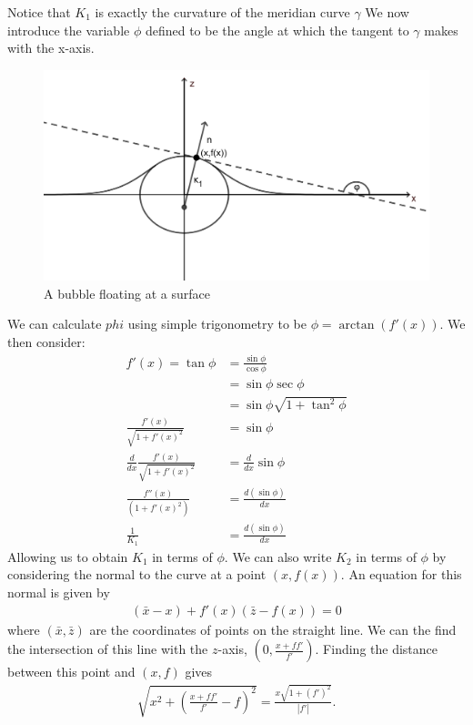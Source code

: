 Notice that $K_1$ is exactly the curvature of the meridian curve $\gamma$
We now introduce the variable $\phi$ defined to be the angle at which the tangent to $\gamma$ makes with the x-axis. 
\begin{figure}[hb]
    \centering
    \includegraphics[width=0.55\linewidth]{WriteUp/images/tangent to bubble extra.png}
    \caption{A bubble floating at a surface}
    \label{fig:1}
\end{figure}
We can calculate $phi$ using simple trigonometry to be $\phi=\arctan(f'(x))$. We then consider:
\begin{align}
    f'(x)=\tan \phi &= \frac{\sin\phi}{\cos\phi} \\
    &=\sin\phi\sec\phi \\
    &=\sin\phi \sqrt{1+\tan^2\phi}\\
    \frac{f'(x)}{\sqrt{1+f'(x)^2}}&=\sin\phi\\
    \frac{d}{dx} \frac{f'(x)}{\sqrt{1+f'(x)^2}}&=\frac{d}{dx}\sin\phi \\
    \frac{f''(x)}{(1+f'(x)^2)}&=\frac{d(\sin\phi)}{dx} \\
    \frac{1}{K_1}&=\frac{d(\sin\phi)}{dx}
\end{align}
Allowing us to obtain $K_1$ in terms of $\phi$.
We can also write $K_2$ in terms of $\phi$ by considering the normal to the curve at a point $(x,f(x))$. An equation for this normal is given by
\begin{align}
    (\bar{x}-x) + f'(x)(\bar{z}-f(x))=0
\end{align}
where $(\bar{x},\bar{z})$ are the coordinates of points on the straight line. We can the find the intersection of this line with the $z$-axis, $(0,\frac{x+ff'}{f'})$.
Finding the distance between this point and $(x,f)$ gives
\begin{align}
    \sqrt{x^2+(\frac{x+ff'}{f'}-f)^2}=\frac{x\sqrt{1+(f')^2}}{|f'|}.
\end{align}